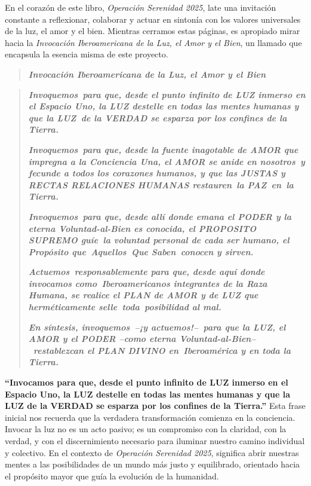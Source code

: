 \documentclass[
]{book}
\begin{document}
En el corazón de este libro, \emph{Operación Serenidad 2025}, late una invitación constante a reflexionar, colaborar y actuar en sintonía con los valores universales de la luz, el amor y el bien. Mientras cerramos estas páginas, es apropiado mirar hacia la \emph{Invocación Iberoamericana de la Luz, el Amor y el Bien}, un llamado que encapsula la esencia misma de este proyecto.

\begin{quote}
\textbf{\emph{Invocación Iberoamericana de la Luz, el Amor y el Bien}}
\end{quote}

\begin{quote}
\textbf{\emph{Invoquemos~para que, desde el punto infinito de LUZ inmerso en el Espacio Uno, la LUZ destelle en todas las mentes humanas y que la LUZ~de la VERDAD se esparza por los confines de la Tierra.}}

\textbf{\emph{Invoquemos~para que, desde la fuente inagotable de AMOR que impregna a la Conciencia Una, el AMOR se anide en nosotros~y fecunde a todos los corazones humanos, y que las JUSTAS y RECTAS RELACIONES HUMANAS restauren~la PAZ~en~la Tierra.}}

\textbf{\emph{Invoquemos~para que, desde allí donde emana el PODER y la eterna Voluntad-al-Bien es conocida, el PROPOSITO SUPREMO guíe~la voluntad personal de cada ser humano, el Propósito que~Aquellos~Que Saben~conocen y sirven.}}~~

\textbf{\emph{Actuemos~responsablemente para que, desde aquí donde invocamos como~Iberoamericanos integrantes de la Raza Humana, se realice el PLAN de AMOR y de LUZ que herméticamente selle~toda~posibilidad al mal.}}

\textbf{\emph{En síntesis, invoquemos~--¡y actuemos!--~para que la LUZ, el AMOR y el PODER --como eterna Voluntad-al-Bien-- ~restablezcan el PLAN DIVINO en~Iberoamérica y en toda la Tierra.}}
\end{quote}

\textbf{``Invocamos para que, desde el punto infinito de LUZ inmerso en el Espacio Uno, la LUZ destelle en todas las mentes humanas y que la LUZ de la VERDAD se esparza por los confines de la Tierra.''} Esta frase inicial nos recuerda que la verdadera transformación comienza en la conciencia. Invocar la luz no es un acto pasivo; es un compromiso con la claridad, con la verdad, y con el discernimiento necesario para iluminar nuestro camino individual y colectivo. En el contexto de \emph{Operación Serenidad 2025}, significa abrir nuestras mentes a las posibilidades de un mundo más justo y equilibrado, orientado hacia el propósito mayor que guía la evolución de la humanidad.
\end{document}
